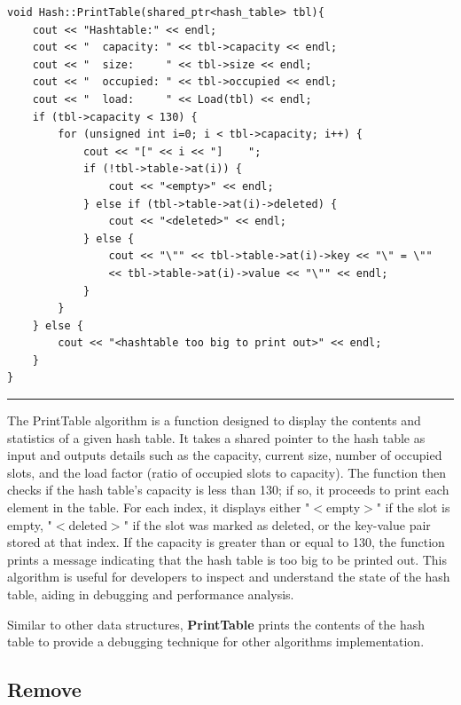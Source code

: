 \documentclass[a4paper,9pt]{article}
\newcommand{\horizontalline}{\noindent \rule{\textwidth}{0.5pt}\par}
\begin{document}
\begin{highlight}

\begin{verbatim}
void Hash::PrintTable(shared_ptr<hash_table> tbl){
    cout << "Hashtable:" << endl;
    cout << "  capacity: " << tbl->capacity << endl;
    cout << "  size:     " << tbl->size << endl;
    cout << "  occupied: " << tbl->occupied << endl;
    cout << "  load:     " << Load(tbl) << endl;
    if (tbl->capacity < 130) {
        for (unsigned int i=0; i < tbl->capacity; i++) {
            cout << "[" << i << "]    ";
            if (!tbl->table->at(i)) {
                cout << "<empty>" << endl;
            } else if (tbl->table->at(i)->deleted) {
                cout << "<deleted>" << endl;
            } else {
                cout << "\"" << tbl->table->at(i)->key << "\" = \"" 
                << tbl->table->at(i)->value << "\"" << endl;
            }
        }
    } else {
        cout << "<hashtable too big to print out>" << endl;
    }
}
\end{verbatim}

\horizontalline

The PrintTable algorithm is a function designed to display the contents and statistics of a given hash table. It takes a shared pointer to the hash table as input and outputs details such as the capacity, 
current size, number of occupied slots, and the load factor (ratio of occupied slots to capacity). The function then checks if the hash table's capacity is less than 130; if so, it proceeds to print each 
element in the table. For each index, it displays either "$<$empty$>$" if the slot is empty, "$<$deleted$>$" if the slot was marked as deleted, or the key-value pair stored at that index. If the capacity is greater 
than or equal to 130, the function prints a message indicating that the hash table is too big to be printed out. This algorithm is useful for developers to inspect and understand the state of the hash table, 
aiding in debugging and performance analysis.

\end{highlight}

\noindent Similar to other data structures, \textbf{PrintTable} prints the contents of the hash table to provide a debugging technique for other algorithms implementation.

\subsection*{Remove}
\end{document}
